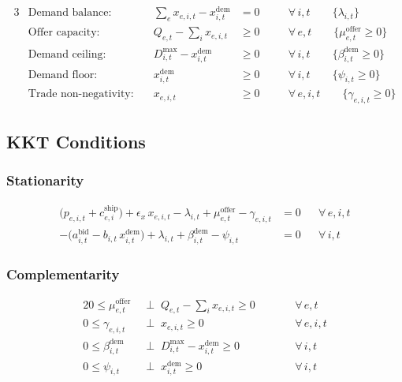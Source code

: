 \documentclass[11pt]{article}
\begin{document}
\begin{alignat}{3}
  &\text{Demand balance:}
    &\quad \sum_{e} x_{e,i,t} - x^{\mathrm{dem}}_{i,t} &= 0
    &&\quad \forall\,i,t
    \qquad \{\lambda_{i,t}\}
  \label{eq:bal}\\[4pt]
  &\text{Offer capacity:}
    &\quad Q_{e,t} - \sum_{i} x_{e,i,t} &\ge 0
    &&\quad \forall\,e,t
    \qquad \{\mu^{\mathrm{offer}}_{e,t}\ge0\}
  \label{eq:cap}\\[4pt]
  &\text{Demand ceiling:}
    &\quad D^{\max}_{i,t} - x^{\mathrm{dem}}_{i,t} &\ge 0
    &&\quad \forall\,i,t
    \qquad \{\beta^{\mathrm{dem}}_{i,t}\ge0\}
  \label{eq:dem-up}\\[4pt]
  &\text{Demand floor:}
    &\quad x^{\mathrm{dem}}_{i,t} &\ge 0
    &&\quad \forall\,i,t
    \qquad \{\psi_{i,t}\ge0\}
  \label{eq:dem-lo}\\[4pt]
  &\text{Trade non-negativity:}
    &\quad x_{e,i,t} &\ge 0
    &&\quad \forall\,e,i,t
    \qquad \{\gamma_{e,i,t}\ge0\}
  \label{eq:x-lo}
\end{alignat}

\subsection{KKT Conditions}

\subsubsection*{Stationarity}

\begin{align}
  \label{eq:stat-x}
  \bigl(p_{e,i,t}+c^{\mathrm{ship}}_{e,i}\bigr)
  + \epsilon_x\,x_{e,i,t}
  - \lambda_{i,t}
  + \mu^{\mathrm{offer}}_{e,t}
  - \gamma_{e,i,t}
  &= 0
  && \forall\,e,i,t \\[6pt]
  \label{eq:stat-dem}
  -\bigl(a^{\mathrm{bid}}_{i,t} - b_{i,t}\,x^{\mathrm{dem}}_{i,t}\bigr)
  + \lambda_{i,t}
  + \beta^{\mathrm{dem}}_{i,t}
  - \psi_{i,t}
  &= 0
  && \forall\,i,t
\end{align}

\subsubsection*{Complementarity}

\begin{alignat}{2}
  \label{eq:comp-mu}
  0 \le \mu^{\mathrm{offer}}_{e,t}
    &\;\perp\;
    Q_{e,t} - \textstyle\sum_{i} x_{e,i,t} \ge 0
    &&\qquad \forall\,e,t \\[3pt]
  \label{eq:comp-gamma}
  0 \le \gamma_{e,i,t}
    &\;\perp\;
    x_{e,i,t} \ge 0
    &&\qquad \forall\,e,i,t \\[3pt]
  \label{eq:comp-beta}
  0 \le \beta^{\mathrm{dem}}_{i,t}
    &\;\perp\;
    D^{\max}_{i,t} - x^{\mathrm{dem}}_{i,t} \ge 0
    &&\qquad \forall\,i,t \\[3pt]
  \label{eq:comp-psi}
  0 \le \psi_{i,t}
    &\;\perp\;
    x^{\mathrm{dem}}_{i,t} \ge 0
    &&\qquad \forall\,i,t
\end{alignat}
\end{document}
